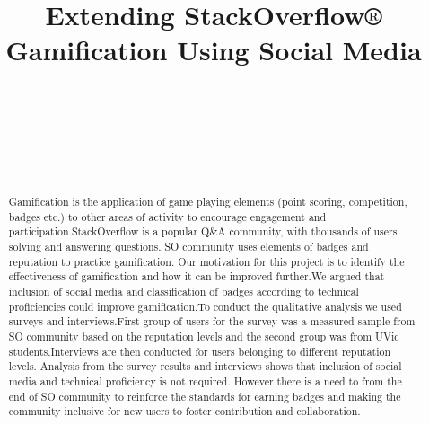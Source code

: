 \documentclass{sigchi}
\begin{document}
\title{Extending StackOverflow® Gamification Using Social Media}

\author{%
    \\
    \\
    \\
    \\
    \\
}

\maketitle

\begin{abstract}
Gamification is the application of game playing elements (point scoring, competition, badges etc.) to other areas of activity to encourage engagement and participation.StackOverflow is a popular Q\&A community, with thousands of users solving and answering questions. SO community uses elements of badges and reputation to practice gamification.  Our motivation for this project is to identify the effectiveness of gamification and how it can be improved further.We argued that inclusion of social media and classification of badges according to technical proficiencies could improve gamification.To conduct the qualitative analysis we used surveys and interviews.First group of users for the survey was a measured sample from SO community based on the reputation levels and the second group was from UVic students.Interviews are then conducted for users belonging to different reputation levels. Analysis from the survey results and interviews shows that inclusion of social media and technical proficiency is not required. However there is a need to from the end of SO community to reinforce the standards for earning badges and making the community inclusive for new users to foster contribution and collaboration.
\end{abstract}
\end{document}
